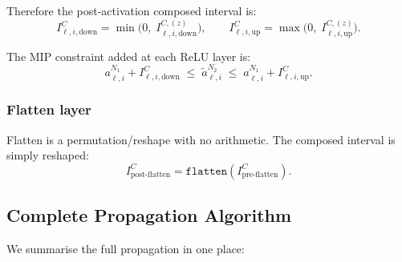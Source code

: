 \documentclass[11pt]{article}
\newcommand{\layerl}{\ell}
\begin{document}
Therefore the post-activation composed interval is:
\begin{equation}
    \boxed{
    I^C_{\layerl,i,\mathrm{down}} = \min\!\bigl(0,\; I^{C,(z)}_{\layerl,i,\mathrm{down}}\bigr),
    \qquad
    I^C_{\layerl,i,\mathrm{up}} = \max\!\bigl(0,\; I^{C,(z)}_{\layerl,i,\mathrm{up}}\bigr).
    }
    \label{eq:ic_relu}
\end{equation}

The MIP constraint added at each ReLU layer is:
\begin{equation}
    a^{N_1}_{\layerl,i} + I^C_{\layerl,i,\mathrm{down}}
    \;\le\;
    \tilde{a}^{N_2}_{\layerl,i}
    \;\le\;
    a^{N_1}_{\layerl,i} + I^C_{\layerl,i,\mathrm{up}}.
    \label{eq:ic_constraint}
\end{equation}

\subsubsection{Flatten layer}

Flatten is a permutation/reshape with no arithmetic. The composed interval
is simply reshaped:
\begin{equation}
    I^C_{\text{post-flatten}} = \texttt{flatten}(I^C_{\text{pre-flatten}}).
\end{equation}

\subsection{Complete Propagation Algorithm}

We summarise the full propagation in one place:
\end{document}
